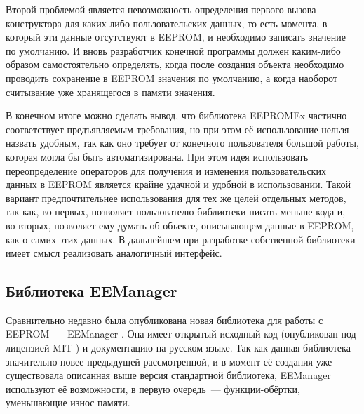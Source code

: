 Второй проблемой является невозможность определения первого вызова конструктора для каких-либо пользовательских данных, то есть момента, в который эти данные отсутствуют в EEPROM, и необходимо записать значение по умолчанию.
И вновь разработчик конечной программы должен каким-либо образом самостоятельно определять, когда после создания объекта необходимо проводить сохранение в EEPROM значения по умолчанию, а когда наоборот считывание уже хранящегося в памяти значения.

В конечном итоге можно сделать вывод, что библиотека EEPROMEx частично соответствует предъявляемым требования, но при этом её использование нельзя назвать удобным, так как оно требует от конечного пользователя большой работы, которая могла бы быть автоматизирована.
При этом идея использовать переопределение операторов для получения и изменения пользовательских данных в EEPROM является крайне удачной и удобной в использовании.
Такой вариант предпочтительнее использования для тех же целей отдельных методов, так как, во-первых, позволяет пользователю библиотеки писать меньше кода и, во-вторых, позволяет ему думать об объекте, описывающем данные в EEPROM, как о самих этих данных.
В дальнейшем при разработке собственной библиотеки имеет смысл реализовать аналогичный интерфейс. %


\subsection{Библиотека EEManager} \label{subsection:eemanager}

Сравнительно недавно была опубликована новая библиотека для работы с EEPROM~--- EEManager \cite{web:eemanager}.
Она имеет открытый исходный код (опубликован под лицензией MIT \cite{web:MIT}) и документацию на русском языке.
Так как данная библиотека значительно новее предыдущей рассмотренной, и в момент её создания уже существовала описанная выше версия стандартной библиотека, EEManager используют её возможности, в первую очередь~--- функции-обёртки, уменьшающие износ памяти.

